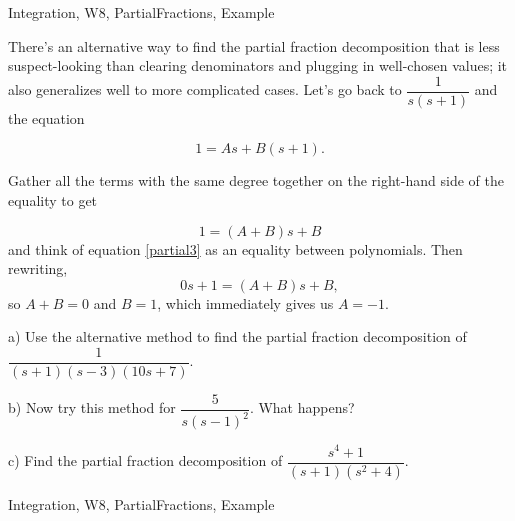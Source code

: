\begin{tagblock}{Integration, W8, PartialFractions, Example}
\begin{question}
There's an alternative way to find the partial fraction decomposition that is less suspect-looking than clearing denominators and plugging in well-chosen values; it also generalizes well to more complicated cases.  Let's go back to $\dfrac 1 {s(s+1)}$ and the equation

\begin{equation}\label{partial2}
1=As+B(s+1).
\end{equation}

Gather all the terms with the same degree together on the right-hand side of the equality to get

\begin{equation}\label{partial3}
1=(A+B)s+B
\end{equation}
and think of equation \eqref{partial3} as an equality between polynomials. Then rewriting,
\[
0s+1=(A+B)s+B,
\]
so $A+B=0$ and $B=1$, which immediately gives us $A=-1$. 

\bigskip

a) Use the alternative method to find the partial fraction decomposition of  $\dfrac 1 {(s+1)(s-3)(10s+7)}$. 

\bigskip


b) Now try this method for $\dfrac 5 {s(s-1)^2}$. What happens?

\bigskip

c) Find the partial fraction decomposition of $\dfrac {s^4+1}{(s+1)(s^2+4)}$.
	
	
\begin{tags}
	   Integration, W8, PartialFractions, Example
\end{tags}
	
\begin{diary}
	   
\end{diary}
	
\begin{solution}
	   
	    \end{enumerate}
\end{solution}
	
\end{question}

\end{tagblock}

